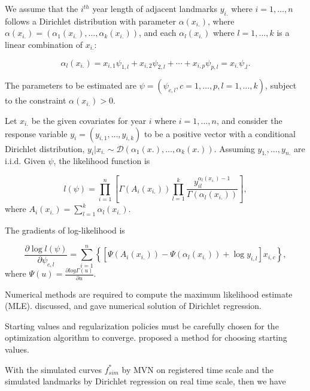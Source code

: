 \documentclass{article}\usepackage[]{graphicx}\usepackage[]{color}
\begin{document}
We assume that the $i^{th}$ year length of adjacent landmarks $y_{i.}$ where $i=1,\dots,n$ follows a Dirichlet distribution with parameter $\alpha(x_{i.})$, where $\alpha(x_{i.})=(\alpha_1(x_{i.}),\dots,\alpha_k(x_{i.}))$, and each $\alpha_l(x_{i.})$ where $l=1,\dots,k$ is a linear combination of $x_{i.}$:

\begin{equation}
\alpha_l(x_{i.}) = x_{i,1}\psi_{1,l} + x_{i,2}\psi_{2,l} +\cdots + x_{i,p}\psi_{p,l} = x_{i.}\psi_{.l}.
\end{equation}

The parameters to be estimated are $\psi=(\psi_{c,l},c=1,\dots,p,l=1,\dots,k)$, subject to the constraint $\alpha(x_{i.})>0$.


Let $x_{i.}$ be the given covariates for year $i$ where $i=1,\dots,n$, and consider the response variable $y_i=(y_{i,1},\dots,y_{i,k})$ to be a positive vector with a conditional Dirichlet distribution, $y_i|x_{i.}\sim \mathcal{D}(\alpha_1(x.),\dots,\alpha_k(x.))$. 
Assuming $y_{1.},\dots,y_{n.}$ are i.i.d. Given $\psi$, the likelihood function is

\begin{equation}
l(\psi) = \prod_{i=1}^{n}\left[\Gamma(A_i(x_{i.}))\prod_{l=1}^k\frac{y_{il}^{\alpha_l(x_{i.})-1}}{\Gamma(\alpha_l(x_{i.}))}\right],
\end{equation}
where $A_i(x_{i.})=\sum_{l=1}^k\alpha_l(x_{i.})$.

The gradients of log-likelihood is 

\begin{equation} 
\frac{\partial \log l(\psi)}{\partial\psi_{c,l}} = \sum_{i=1}^{n}\left\{[\Psi(A_i(x_{i.}))-\Psi(\alpha_l(x_{i.}))+\log y_{i,l}]x_{i,c}\right\},
\end{equation}
where $\Psi(u) = \frac{\partial log\Gamma(u)}{\partial u}$.

\medskip

Numerical methods are required to compute the maximum likelihood estimate (MLE). \citet{camargo2012estimation} discussed, and gave numerical solution of Dirichlet regression. 

Starting values and regularization policies must be carefully chosen for the optimization algorithm to converge. \citet{hijazi2009modelling} proposed a method for choosing starting values. 

\medskip

With the simulated curves $f^{*}_{sim}$ by MVN on registered time scale and the simulated landmarks by Dirichlet regression on real time scale, then we have 
\end{document}
